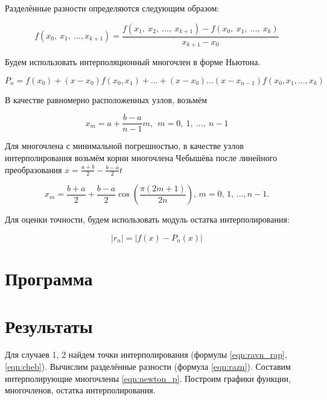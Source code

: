 \documentclass[12pt, a4paper]{article}
\begin{document}
Разделённые разности определяются следующим образом:

\begin{equation}
	f(x_0, \ x_1, \ \dots  , x_{k+1}) = \frac{f(x_1, \ x_2, \ \dots, \ x_{k+1})-f(x_0, \ x_1, \ \dots, \ x_k)}{x_{k+1}- x_0}
	\label{eqn:razn}
\end{equation}

Будем использовать интерполяционный многочлен в форме Ньютона.

\begin{equation}
    P_n = f(x_0) + (x-x_0) f(x_0, x_1) + \dots + (x-x_0) \dots (x-x_{n-1}) f(x_0,  x_1, \dots, x_k)
    \label{eqn:newton_p}
\end{equation}

В качестве равномерно расположенных узлов, возьмём

\begin{equation}
	x_m = a + \frac{b-a}{n-1}m, \ \ m = 0, \ 1, \ \dots, \ n-1
	\label{eqn:ravn_rap}
\end{equation}

Для многочлена с минимальной погрешностью, в качестве узлов интерполирования возьмём корни многочлена Чебышёва после линейного преобразования $x = \frac{a+b}{2} - \frac{b-a}{2}t$

\begin{equation}
    x_m = \frac{b+a}{2} + \frac{b-a}{2} \cos \left( \frac{\pi (2m + 1)}{2n}\right), \, m = 0, \, 1, \, \dots, n-1.
    \label{eqn:cheb}
\end{equation}

Для оценки точности, будем использовать модуль остатка интерполирования:

\begin{equation}
	| r_n | = |f(x) - P_n(x)|
	\label{ost}
\end{equation}
	
\section{Программа}
	

	
\section{Результаты}

Для случаев 1, 2 найдем точки интерполирования (формулы \eqref{eqn:ravn_rap}, \eqref{eqn:cheb}). Вычислим разделённые разности (формула \eqref{eqn:razn}). Составим интерполирующие многочлены \eqref{eqn:newton_p}. Построим графики функции, многочленов, остатка интерполирования.
\end{document}
